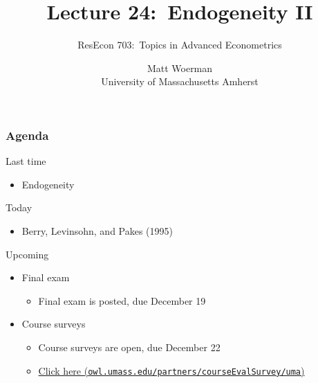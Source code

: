 \documentclass{beamer}
\title[Lecture 24:\ Endogeneity II]{Lecture 24:\ Endogeneity II}
\author[ResEcon 703:\ Advanced Econometrics]{ResEcon 703:\ Topics in Advanced Econometrics}
\date{Matt Woerman\\University of Massachusetts Amherst}
\begin{document}
{ 
\begin{frame}[noframenumbering]
    \titlepage
\end{frame}
}

\begin{frame}\frametitle{Agenda}
    Last time
    \begin{itemize}
        \item Endogeneity
    \end{itemize}
    \vspace{2ex}
    Today
    \begin{itemize}
        \item Berry, Levinsohn, and Pakes (1995)
    \end{itemize}
    \vspace{2ex}
    Upcoming
    \begin{itemize}
        \item Final exam
        \begin{itemize}
        	\item Final exam is posted, due December 19
        \end{itemize}
        \item Course surveys
        \begin{itemize}
            \item Course surveys are open, due December 22
            \item \href{http://owl.umass.edu/partners/courseEvalSurvey/uma/}{Click here (\texttt{owl.umass.edu/partners/courseEvalSurvey/uma})}
        \end{itemize}
    \end{itemize}
\end{frame}
\end{document}
